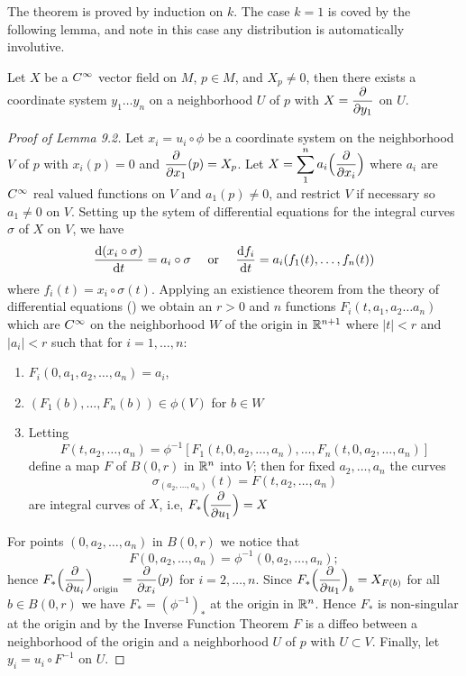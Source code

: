 \documentclass[../main]{subfiles}
\begin{document}
The theorem is proved by induction on $k$. The case $k=1$ is coved by the following lemma, and note in this case any distribution is automatically involutive.

\begin{lemma}\label{lem:ch09.1.2}
Let $X$ be a $C^\infty$ vector field on $M$, $p\in M$, and $X_p\neq 0$, then there exists a coordinate system $y_1\dots y_n$ on a neighborhood $U$ of $p$ with $X=\dfrac{\partial }{\partial y_1}$ on $U$.
\end{lemma}
\begin{proof}[Proof of Lemma 9.2]
Let $x_i=u_i\circ \phi$ be a coordinate system on the neighborhood $V$ of $p$ with $x_i(p)=0$ and $\dfrac{\partial }{\partial x_1}(p)=X_p$. Let $X=\displaystyle \sum_1^n a_i \Big(\dfrac{\partial }{\partial x_i}\Big)$ where $a_i$ are $C^\infty$ real valued functions on $V$ and $a_1(p)\neq 0$, and restrict $V$ if necessary so $a_1\neq 0$ on $V$. Setting up the sytem of differential equations for the integral curves $\sigma$ of $X$ on $V$, we have 
\[\dfrac{\mathrm{d}(x_i\circ \sigma)}{\mathrm{d}t} = a_i \circ \sigma \quad \text{ or } \quad \dfrac{\mathrm{d}f_i}{\mathrm{d}t}= a_i(f_1(t),\dots,f_n(t)) \]
where $f_i (t)=x_i \circ \sigma(t)$. Applying an existience theorem from the theory of differential equations (\cite[Chapter 1]{coddington1990theory}) we obtain an $r>0$ and $n$ functions $F_i(t,a_1,a_2\dots a_n)$ which are $C^\infty$ on the neighborhood $W$ of the origin in $\mathbb{R}^{n+1}$ where $|t|<r$ and $|a_i|<r$ such that for $i=1,\dots,n$:
\begin{enumerate}[label = (\arabic*)]
    \item $F_i(0,a_1,a_2,\dots,a_n)=a_i$,
    \item $(F_1(b),\dots,F_n(b))\in \phi(V)$ for $b\in W$
    \item Letting \[F(t,a_2,\dots, a_n)=\phi^{-1}[F_1(t,0,a_2,\dots,a_n),\dots, F_n(t,0,a_2,\dots ,a_n)]\]
    define a map $F$ of $B(0,r)$ in $\mathbb{R}^n$ into $V$; then for fixed $a_2,\dots,a_n$ the curves \[\sigma_{(a_2,\dots,a_n)}(t)=F(t,a_2,\dots,a_n)\]
    are integral curves of $X$, i.e, $F_\ast\Big(\dfrac{\partial }{\partial u_1}\Big)=X$
\end{enumerate}

For points $(0,a_2,\dots,a_n)$ in $B(0,r)$ we notice that \[F(0,a_2,\dots,a_n)=\phi^{-1}(0,a_2,\dots,a_n);\] hence $F_\ast\Big(\dfrac{\partial }{\partial u_i}\Big)_{\text{origin}} = \dfrac{\partial }{\partial x_i}(p)$ for $i=2,\dots,n$. Since $F_\ast \Big(\dfrac{\partial }{\partial u_1}\Big)_b= X_{F(b)}$ for all $b\in B(0,r)$ we have $F_\ast = (\phi^{-1})_\ast$ at the origin in $\mathbb{R}^n$. Hence $F_\ast$ is non-singular at the origin and by the Inverse Function Theorem $F$ is a diffeo between a neighborhood of the origin and a neighborhood $U$ of $p$ with $U\subset V$. Finally, let $y_i=u_i\circ F^{-1}$ on $U$.
\end{proof}
\end{document}
